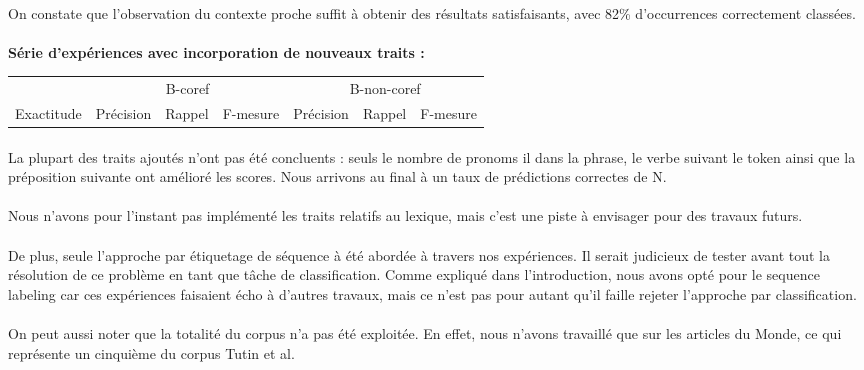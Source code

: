 \documentclass[a4paper,12pt]{article}
\begin{document}
\paragraph{}
On constate que l'observation du contexte proche suffit à obtenir des résultats satisfaisants, avec 82\% d'occurrences correctement classées.

\paragraph{}
\textbf{Série d'expériences avec incorporation de nouveaux traits :}

\begin{tabular}[H]{l|lll|lll}
& \multicolumn{3}{c|}{B-coref} & \multicolumn{3}{c}{B-non-coref}\\
Exactitude & Précision & Rappel & F-mesure & Précision & Rappel & F-mesure\\
\hline

\hline
\end{tabular}

\paragraph{}
La plupart des traits ajoutés n'ont pas été concluents : seuls le nombre de pronoms \og il \fg{} dans la phrase, le verbe suivant le token ainsi que la préposition suivante ont amélioré les scores. Nous arrivons au final à un taux de prédictions correctes de N.

\paragraph{}
Nous n'avons pour l'instant pas implémenté les traits relatifs au lexique, mais c'est une piste à envisager pour des travaux futurs.

\paragraph{}
De plus, seule l'approche par étiquetage de séquence à été abordée à travers nos expériences. Il serait judicieux de tester avant tout la résolution de ce problème en tant que tâche de classification. Comme expliqué dans l'introduction, nous avons opté pour le sequence labeling car ces expériences faisaient écho à d'autres travaux, mais ce n'est pas pour autant qu'il faille rejeter l'approche par classification.

\paragraph{}
On peut aussi noter que la totalité du corpus n'a pas été exploitée. En effet, nous n'avons travaillé que sur les articles du Monde, ce qui représente un cinquième du corpus Tutin et al.
\end{document}
